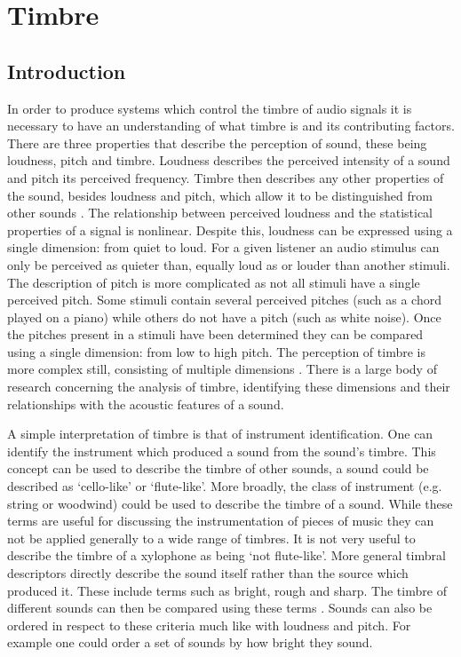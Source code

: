 
\chapter{Timbre}
\label{chap:Timbre}

\section{Introduction}
\label{sec:Timbre-Introduction}
	In order to produce systems which control the timbre of audio signals it is necessary to have an understanding of
	what timbre is and its contributing factors. There are three properties that describe the perception of sound,
	these being loudness, pitch and timbre.  Loudness describes the perceived intensity of a sound and pitch its
	perceived frequency. Timbre then describes any other properties of the sound, besides loudness and pitch, which
	allow it to be distinguished from other sounds \citep{mathews1999introduction}. The relationship between perceived
	loudness and the statistical properties of a signal is nonlinear. Despite this, loudness can be expressed using a
	single dimension: from quiet to loud. For a given listener an audio stimulus can only be perceived as quieter than,
	equally loud as or louder than another stimuli. The description of pitch is more complicated as not all stimuli
	have a single perceived pitch. Some stimuli contain several perceived pitches (such as a chord played on a piano)
	while others do not have a pitch (such as white noise). Once the pitches present in a stimuli have been determined
	they can be compared using a single dimension: from low to high pitch. The perception of timbre is more complex
	still, consisting of multiple dimensions \citep{rossing2002the}. There is a large body of research concerning the
	analysis of timbre, identifying these dimensions and their relationships with the acoustic features of a sound.

	A simple interpretation of timbre is that of instrument identification. One can identify the instrument which
	produced a sound from the sound's timbre. This concept can be used to describe the timbre of other sounds, a sound
	could be described as `cello-like' or `flute-like'. More broadly, the class of instrument (e.g. string or woodwind)
	could be used to describe the timbre of a sound. While these terms are useful for discussing the instrumentation of
	pieces of music they can not be applied generally to a wide range of timbres. It is not very useful to describe the
	timbre of a xylophone as being `not flute-like'. More general timbral descriptors directly describe the sound
	itself rather than the source which produced it. These include terms such as bright, rough and sharp. The timbre of
	different sounds can then be compared using these terms \citep{howard2009acoustics}. Sounds can also be ordered in
	respect to these criteria much like with loudness and pitch. For example one could order a set of sounds by how
	bright they sound.

